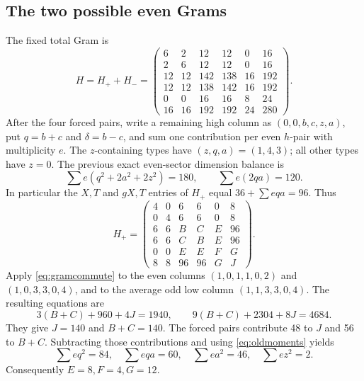 \documentclass[10pt]{article}
\begin{document}
\subsection*{The two possible even Grams}
The fixed total Gram is
\[
 H=H_++H_-=
 \begin{pmatrix}
 6&2&12&12&0&16\\2&6&12&12&0&16\\
 12&12&142&138&16&192\\12&12&138&142&16&192\\
 0&0&16&16&8&24\\16&16&192&192&24&280
 \end{pmatrix}.
\]
After the four forced pairs, write a remaining high column as $(0,0,b,c,z,a)$, put $q=b+c$ and $\delta=b-c$, and sum one contribution per even $h$-pair with multiplicity $e$. The $z$-containing types have $(z,q,a)=(1,4,3)$; all other types have $z=0$. The previous exact even-sector dimension balance is
\begin{equation}\label{eq:oldmoments}
 \sum e(q^2+2a^2+2z^2)=180,\qquad \sum e(2qa)=120.
\end{equation}
In particular the $X,T$ and $gX,T$ entries of $H_+$ equal $36+\sum eqa=96$. Thus
\[
 H_+=\begin{pmatrix}
 4&0&6&6&0&8\\0&4&6&6&0&8\\
 6&6&B&C&E&96\\6&6&C&B&E&96\\
 0&0&E&E&F&G\\8&8&96&96&G&J
 \end{pmatrix}.
\]
Apply \eqref{eq:gramcommute} to the even columns $(1,0,1,1,0,2)$ and $(1,0,3,3,0,4)$, and to the average odd low column $(1,1,3,3,0,4)$. The resulting equations are
\[
 3(B+C)+960+4J=1940,\qquad
 9(B+C)+2304+8J=4684.
\]
They give $J=140$ and $B+C=140$. The forced pairs contribute 48 to $J$ and 56 to $B+C$. Subtracting those contributions and using \eqref{eq:oldmoments} yields
\begin{equation}\label{eq:newmoments}
 \boxed{\sum eq^2=84,\quad\sum eqa=60,\quad
 \sum ea^2=46,\quad\sum ez^2=2.}
\end{equation}
Consequently $E=8,F=4,G=12$.
\end{document}
